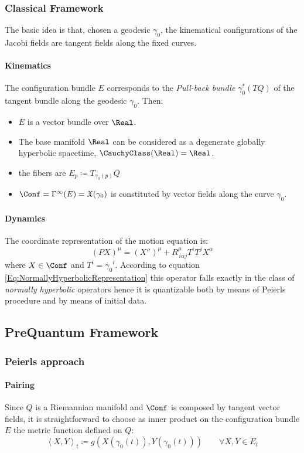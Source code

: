 \documentclass[Main]{subfiles}
\begin{document}
		\subsubsection{Classical Framework}
			The basic idea is that, chosen a geodesic $\gamma_0$, the kinematical configurations of the Jacobi fields are tangent fields along the fixed curves.
			\paragraph{Kinematics}	
			The configuration bundle $E$ corresponds to the \emph{Pull-back bundle} $\gamma_0^*(TQ)$ of the tangent bundle along the geodesic $\gamma_0$.
			Then:
			\begin{itemize}
				\item $E$ is a vector bundle over $\Real$.
				\item The base manifold $\Real$ can be considered as a degenerate globally hyperbolic spacetime, $\CauchyClass(\Real) = \Real$.
				\item the fibers are $E_p \coloneqq T_{\gamma_0(p)}Q$
				\item $\Conf = \Gamma^\infty(E) = \mathfrak{X}(\gamma_0)$ is constituted by vector fields along the curve $\gamma_0$.
			\end{itemize}
			
			\paragraph{Dynamics}
				The coordinate representation of the motion equation is:
				\begin{displaymath}
					\left( P X \right)^\mu = (X'')^\mu + R^\mu_{\, i \alpha j } T^i T^j X^\alpha
				\end{displaymath}
				where $X\in \Conf$ and $T^i = \dot{\gamma_0}^i$.
				According to equation \ref{Eq:NormallyHyperbolicRepresentation} this operator falls exactly in the class of \emph{normally hyperbolic} operators hence it is quantizable both by  means of Peierls procedure and by means of initial data.
		
		\subsection{PreQuantum Framework}
		\subsubsection{Peierls approach}
			\paragraph{Pairing}
				Since $Q$ is a Riemannian manifold and $\Conf$ is composed by tangent vector fields, it is straightforward to choose as inner product on the configuration bundle $E$ the metric function defined on $Q$:
				\begin{equation}
					\left\langle X,Y \right\rangle_t \coloneqq g\left( X\left(\gamma_0(t) \right),Y\left(\gamma_0(t) \right)\right)
					\qquad \forall X,Y \in E_t
				\end{equation}
				
\end{document}

